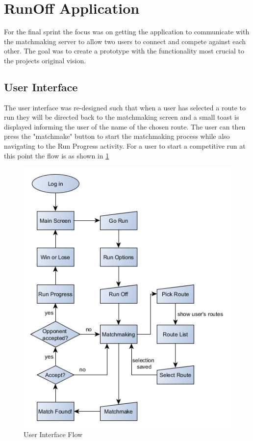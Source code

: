 \section{RunOff Application}
For the final sprint the focus was on getting the application to communicate with the matchmaking server to allow two users to connect and compete against each other. The goal was to create a prototype with the functionality most crucial to the projects original vision.

\subsection{User Interface} 
The user interface was re-designed such that when a user has selected a route to run they will be directed back to the matchmaking screen and a small toast is displayed informing the user of the name of the chosen route. The user can then press the "matchmake" button to start the matchmaking process while also navigating to the Run Progress activity. For a user to start a competitive run at this point the flow is as shown in \ref{fig:userflow}

\begin{figure}[ht]
\begin{center}
 \caption{User Interface Flow}
 \label{fig:userflow}
 \includegraphics[scale=0.4]{img/runappflow.png}
\end{center}
\end{figure}

